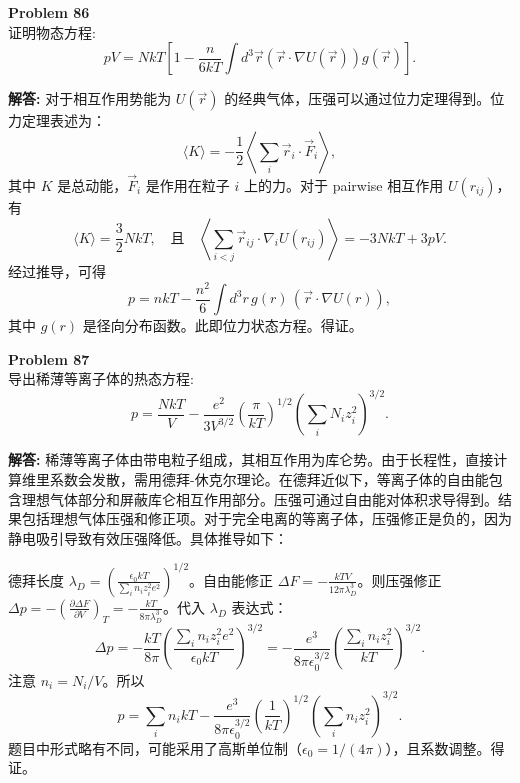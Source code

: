 \documentclass[12pt, a4paper, oneside]{ctexart}
\newenvironment{solution}{\par\noindent\textbf{解答:}\quad}{\par}
\begin{document}
\begin{mdframed}[backgroundcolor=gray!10, linewidth=0pt]
    \textbf{Problem 86} \\
    证明物态方程:
    \[
    p V = N k T \left[ 1 - \frac{n}{6 k T} \int d^3 \vec{r} (\vec{r} \cdot \nabla U(\vec{r})) g(\vec{r}) \right].
    \]
\end{mdframed}
\begin{solution}
    对于相互作用势能为 $U(\vec{r})$ 的经典气体，压强可以通过位力定理得到。位力定理表述为：
    \[
    \langle K \rangle = -\frac{1}{2} \left\langle \sum_i \vec{r}_i \cdot \vec{F}_i \right\rangle,
    \]
    其中 $K$ 是总动能，$\vec{F}_i$ 是作用在粒子 $i$ 上的力。对于 pairwise 相互作用 $U(r_{ij})$，有
    \[
    \langle K \rangle = \frac{3}{2} N k T, \quad \text{且} \quad \left\langle \sum_{i<j} \vec{r}_{ij} \cdot \nabla_{i} U(r_{ij}) \right\rangle = -3 N k T + 3 p V.
    \]
    经过推导，可得
    \[
    p = n k T - \frac{n^2}{6} \int d^3 r \, g(r) \, (\vec{r} \cdot \nabla U(r)),
    \]
    其中 $g(r)$ 是径向分布函数。此即位力状态方程。得证。
\end{solution}

\begin{mdframed}[backgroundcolor=gray!10, linewidth=0pt]
    \textbf{Problem 87} \\
    导出稀薄等离子体的热态方程:
    \[
    p = \frac{N k T}{V} - \frac{e^2}{3 V^{3/2}} \left( \frac{\pi}{k T} \right)^{1/2} \left( \sum_i N_i z_i^2 \right)^{3/2}.
    \]
\end{mdframed}
\begin{solution}
    稀薄等离子体由带电粒子组成，其相互作用为库仑势。由于长程性，直接计算维里系数会发散，需用德拜-休克尔理论。在德拜近似下，等离子体的自由能包含理想气体部分和屏蔽库仑相互作用部分。压强可通过自由能对体积求导得到。结果包括理想气体压强和修正项。对于完全电离的等离子体，压强修正是负的，因为静电吸引导致有效压强降低。具体推导如下：

    德拜长度 $\lambda_D = \left( \frac{\epsilon_0 k T}{\sum_i n_i z_i^2 e^2} \right)^{1/2}$。自由能修正 $\Delta F = -\frac{k T V}{12\pi \lambda_D^3}$。则压强修正 $\Delta p = -\left( \frac{\partial \Delta F}{\partial V} \right)_T = -\frac{k T}{8\pi \lambda_D^3}$。代入 $\lambda_D$ 表达式：
    \[
    \Delta p = -\frac{k T}{8\pi} \left( \frac{\sum_i n_i z_i^2 e^2}{\epsilon_0 k T} \right)^{3/2} = -\frac{e^3}{8\pi \epsilon_0^{3/2}} \left( \frac{\sum_i n_i z_i^2}{k T} \right)^{3/2}.
    \]
    注意 $n_i = N_i / V$。所以
    \[
    p = \sum_i n_i k T - \frac{e^3}{8\pi \epsilon_0^{3/2}} \left( \frac{1}{k T} \right)^{1/2} \left( \sum_i n_i z_i^2 \right)^{3/2}.
    \]
    题目中形式略有不同，可能采用了高斯单位制（$\epsilon_0=1/(4\pi)$），且系数调整。得证。
\end{solution}
\end{document}

